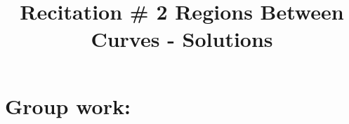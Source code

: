\documentclass[noinstructornotes]{ximera}
\title{Recitation \# 2 Regions Between Curves - Solutions}
\begin{document}
\begin{abstract}		\end{abstract}
\maketitle

\section{Group work:}
\end{document}
